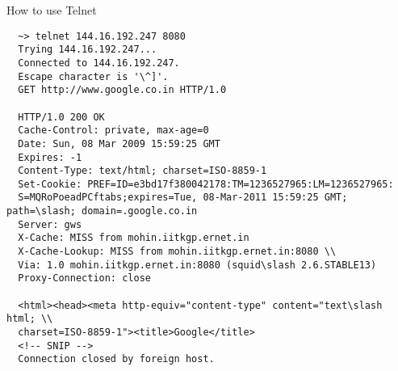 How to use Telnet
\begin{lstlisting}
  ~> telnet 144.16.192.247 8080
  Trying 144.16.192.247...
  Connected to 144.16.192.247.
  Escape character is '\^]'.
  GET http://www.google.co.in HTTP/1.0

  HTTP/1.0 200 OK
  Cache-Control: private, max-age=0
  Date: Sun, 08 Mar 2009 15:59:25 GMT
  Expires: -1
  Content-Type: text/html; charset=ISO-8859-1
  Set-Cookie: PREF=ID=e3bd17f380042178:TM=1236527965:LM=1236527965:
  S=MQRoPoeadPCftabs;expires=Tue, 08-Mar-2011 15:59:25 GMT; path=\slash; domain=.google.co.in
  Server: gws
  X-Cache: MISS from mohin.iitkgp.ernet.in
  X-Cache-Lookup: MISS from mohin.iitkgp.ernet.in:8080 \\
  Via: 1.0 mohin.iitkgp.ernet.in:8080 (squid\slash 2.6.STABLE13)
  Proxy-Connection: close

  <html><head><meta http-equiv="content-type" content="text\slash html; \\
  charset=ISO-8859-1"><title>Google</title>
  <!-- SNIP -->
  Connection closed by foreign host.
\end{lstlisting}

